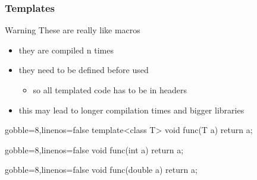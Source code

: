 \begin{frame}[fragile]
  \frametitle{Templates}
  \begin{alertblock}{Warning}
    These are really like macros
    \begin{itemize}
      \item they are compiled n times
      \item they need to be defined before used
      \begin{itemize}
        \item so all templated code has to be in headers
      \end{itemize}
      \item this may lead to longer compilation times and bigger libraries
    \end{itemize}
  \end{alertblock}
  \newsavebox{\codepiece}
  \begin{lrbox}{\codepiece}
    \begin{minipage}{.35\linewidth}
      \begin{cppcode*}{gobble=8,linenos=false}
        template<class T>
        void func(T a) {
          return a;
        }
      \end{cppcode*}
    \end{minipage}
  \end{lrbox}
  \newsavebox{\codepiecea}
  \begin{lrbox}{\codepiecea}
    \begin{minipage}{.4\linewidth}
      \begin{cppcode*}{gobble=8,linenos=false}
        void func(int a) {
          return a;
        }
      \end{cppcode*}
    \end{minipage}
  \end{lrbox}
  \newsavebox{\codepieceb}
  \begin{lrbox}{\codepieceb}
    \begin{minipage}{.4\linewidth}
      \begin{cppcode*}{gobble=8,linenos=false}
        void func(double a) {
          return a;
        }
      \end{cppcode*}
    \end{minipage}
  \end{lrbox}
\end{frame}

